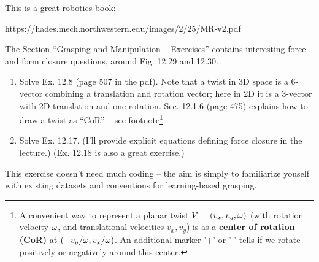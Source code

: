 

This is a great robotics book:

\url{https://hades.mech.northwestern.edu/images/2/25/MR-v2.pdf}

The Section ``Grasping and Manipulation -- Exercises'' contains
interesting force and form closure questions, around Fig. 12.29 and
12.30.

\begin{enumerate}
\item Solve Ex. 12.8 (page 507 in the pdf). Note that a twist in 3D
space is a 6-vector combining a translation and rotation vector; here
in 2D it is a 3-vector with 2D translation and one
rotation. Sec. 12.1.6 (page 475) explains how to draw a twist as
``CoR'' -- see footnote\footnote{A convenient way to represent a
planar twist $V = (v_x, v_y, \omega)$ (with rotation velocity $\omega$, and
translational velocities $v_x,v_y$) is as a \textbf{center of
rotation (CoR)} at $(-v_y /\omega , v_x /\omega )$. An additional marker '+'
or '-' tells if we rotate positively or negatively around this center.}

\item Solve Ex. 12.17. (I'll provide explicit equations defining force
closure in the lecture.) (Ex. 12.18 is also a great exercise.)

\end{enumerate}



This exercise doesn't need much coding -- the aim is simply to familiarize
youself with existing datasets and conventions for learning-based grasping.

